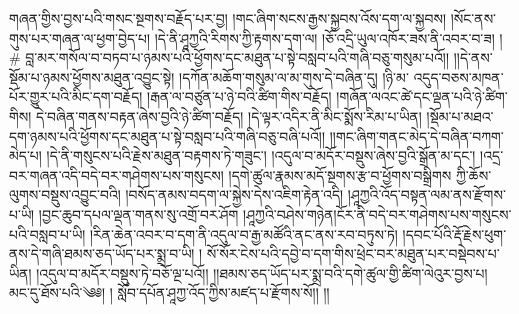གཞན་གྱིས་བྱས་པའི་གསང་སྔགས་བརྗོད་པར་བྱ། །གང་ཞིག་སངས་རྒྱས་སྐྱབས་འོས་དག་ལ་སྐྱབས། །སོང་ནས་གུས་པར་གཞན་ལ་ཕྱག་བྱེད་པ། །དེ་ནི་ཤཱཀྱའི་རིགས་ཀྱི་རྟགས་དག་ལ། །ཅོ་འདྲི་ཡུལ་འཁོར་ཟས་ནི་འབར་བ་ཟ། །# བླ་མར་གསོལ་བ་བཏབ་པ་ཉམས་པའི་ཕྱོགས་དང་མཐུན་པ་སྟེ་བསླབ་པའི་གཞི་བཅུ་གསུམ་པའོ།། །།དེ་ནས་སྡོམ་པ་ཉམས་ཕྱོགས་མཐུན་འབྱུང་སྟེ། །དཀོན་མཆོག་གསུམ་ལ་མ་གུས་དེ་བཞིན་དུ། །ཉི་མ་%
འདུད་བཅས་མཁན་པོར་གྱུར་པའི་མིང་དག་བརྗོད། །རྒན་ལ་བཙུན་པ་ཉེ་བའི་ཚིག་གིས་བརྗོད། །གཞོན་ལའང་ཚེ་དང་ལྡན་པའི་ཉེ་ཚིག་གིས། དེ་བཞིན་གནས་བརྟན་ཞེས་བྱའི་ཉེ་ཚིག་བརྗོད། །དེ་ལྟར་འདིར་ནི་མིང་སྨོས་རིམ་པ་ཡིན། །སྡོམ་པ་མཐའ་དག་ཉམས་པའི་ཕྱོགས་དང་མཐུན་པ་སྟེ་བསླབ་པའི་གཞི་བཅུ་བཞི་པའོ།། །།གང་ཞིག་གནང་མེད་དེ་བཞིན་བཀག་མེད་པ། །དེ་ནི་གསུངས་པའི་རྗེས་མཐུན་བརྟགས་ཏེ་གཟུང་། །འདུལ་བ་མདོར་བསྡུས་ཞེས་བྱའི་སྒྲོན་མ་དང་། །འདྲ་བར་གཞན་འདི་བདེ་བར་གཤེགས་པས་གསུངས། །དགེ་ཚུལ་རྣམས་མདོ་སྔགས་རྩ་བ་ཕྱོགས་བསྒྲིགས ཀྱི་ཆོས་ལུགས་བསྡུས་འབྱུང་བའི། །བསོད་ནམས་བདག་ལ་སྐྱེས་དེས་འཇིག་རྟེན་འདི། །ཤཱཀྱའི་འོད་བསྟན་ལམ་ནས་རྫོགས་པ་ཡི། །བྱང་ཆུབ་དཔལ་ལྡན་གནས་སུ་འགྲོ་བར་ཤོག །ཤཱཀྱའི་བཤེས་གཉེན།ངོར་ནི་བདེ་བར་གཤེགས་པས་གསུངས་པའི་བསླབ་པ་ཡི། །རིན་ཆེན་འབར་བ་དག་ནི་འདུལ་བ་རྒྱ་མཚོའི་ནང་ནས་རབ་བཏུས་ཏེ། །དབང་པོའི་རྡོ་རྗེས་ཕུག་ནས་དེ་གཞི་ཐམས་ཅད་ཡོད་པར་སྨྲ་བ་ཡི། ། སོ་སོར་ངེས་པའི་དབྱེ་བ་དག་གིས་ཕྲེང་བར་མཐུན་པར་བསྡེབས་པ་ཡིན། །འདུལ་བ་མདོར་བསྡུས་ཏེ་བཅོ་ལྔ་པའོ།། །།ཐམས་ཅད་ཡོད་པར་སྨྲ་བའི་དགེ་ཚུལ་གྱི་ཚིག་ལེའུར་བྱས་པ། མང་དུ་ཐོས་པའི་༄༅། ། སློབ་དཔོན་ཤཱཀྱ་འོད་ཀྱིས་མཛད་པ་རྫོགས་སོ།། །།